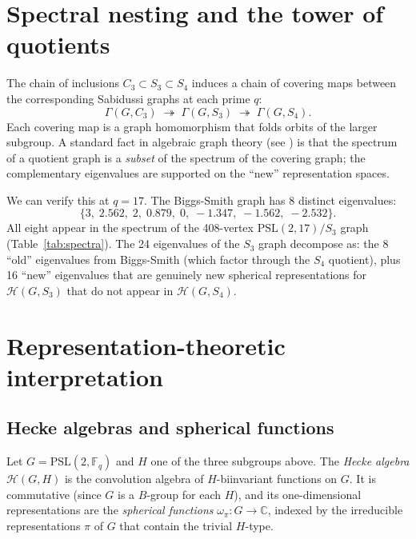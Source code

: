 \documentclass[11pt,a4paper]{amsart}
\theoremstyle{definition}
\theoremstyle{remark}
\newcommand{\PSL}[1]{\mathrm{PSL}(2,\mathbb{F}_{#1})}
\newcommand{\C}{\mathbb{C}}
\begin{document}
\section{Spectral nesting and the tower of quotients}\label{sec:nesting}

The chain of inclusions $C_3 \subset S_3 \subset S_4$ induces a chain of
covering maps between the corresponding Sabidussi graphs at each prime $q$:
\[
  \Gamma(G, C_3) \;\twoheadrightarrow\; \Gamma(G, S_3) \;\twoheadrightarrow\; \Gamma(G, S_4).
\]
Each covering map is a graph homomorphism that folds orbits of the larger
subgroup.  A standard fact in algebraic graph theory (see \cite{BH2012}) is
that the spectrum of a quotient graph is a \emph{subset} of the spectrum of
the covering graph; the complementary eigenvalues are supported on the
``new'' representation spaces.

We can verify this at $q=17$.  The Biggs-Smith graph has 8 distinct eigenvalues:
\[
  \{3,\; 2.562,\; 2,\; 0.879,\; 0,\; -1.347,\; -1.562,\; -2.532\}.
\]
All eight appear in the spectrum of the 408-vertex $\mathrm{PSL}(2,17)/S_3$
graph (Table~\ref{tab:spectra}).  The 24 eigenvalues of the $S_3$ graph
decompose as: the 8 ``old'' eigenvalues from Biggs-Smith (which factor through
the $S_4$ quotient), plus 16 ``new'' eigenvalues that are genuinely new
spherical representations for $\mathcal{H}(G,S_3)$ that do not appear in
$\mathcal{H}(G,S_4)$.

\section{Representation-theoretic interpretation}\label{sec:repthy}

\subsection{Hecke algebras and spherical functions}

Let $G = \PSL{q}$ and $H$ one of the three subgroups above.  The
\emph{Hecke algebra} $\mathcal{H}(G,H)$ is the convolution algebra of
$H$-biinvariant functions on $G$.  It is commutative (since $G$ is a
$B$-group for each $H$), and its one-dimensional representations are the
\emph{spherical functions} $\omega_\pi\colon G \to \C$, indexed by the
irreducible representations $\pi$ of $G$ that contain the trivial $H$-type.
\end{document}
